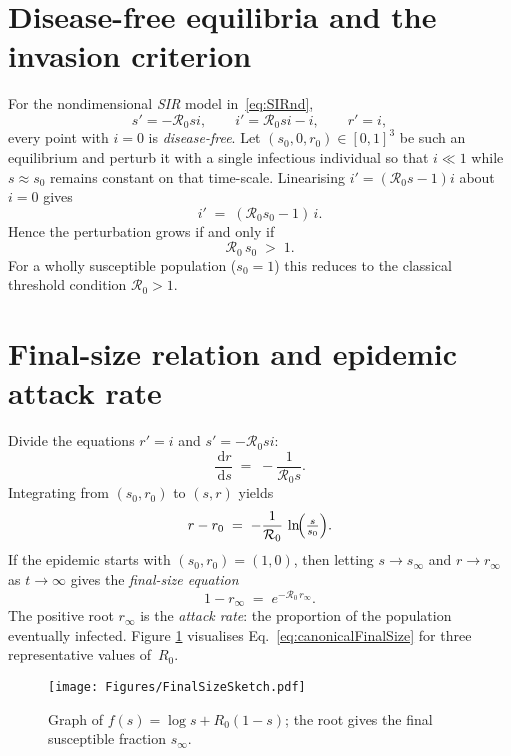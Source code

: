 \documentclass[11pt]{article}
\newcommand{\dd}{\,\mathrm{d}}
\newcommand{\RR}{\mathcal{R}_0}
\begin{document}
\section{Disease-free equilibria and the invasion criterion}\label{sec:DFE}

For the nondimensional \textit{SIR} model in~\cref{eq:SIRnd},
\[
s'=-\RR si, \qquad
i'=\RR si-i, \qquad
r'=i ,
\]
every point with $i=0$ is \emph{disease-free}.  Let
\(
(s_0,0,r_0)\in[0,1]^3
\)
be such an equilibrium and perturb it with a single infectious
individual so that $i\ll1$ while $s\approx s_0$ remains constant on that
time-scale.  Linearising $i'=(\RR s-1)i$ about $i=0$ gives
\begin{equation*}
  i' \;=\; (\RR s_0 - 1)\,i .
\end{equation*}
Hence the perturbation grows if and only if
\begin{equation*}
  \RR\,s_0 \;>\; 1 .
\end{equation*}
For a wholly susceptible population ($s_0=1$) this reduces to the classical
threshold condition $\RR>1$.

\section{Final-size relation and epidemic attack rate}\label{sec:FinalSize}

Divide the equations $r'=i$ and $s'=-\RR si$:
\[
\frac{\dd r}{\dd s} \;=\; -\frac{1}{\RR s}.
\]
Integrating from $(s_0,r_0)$ to $(s,r)$ yields
\begin{equation}\label{eq:generalFinalSize}
  r - r_0 \;=\; -\frac{1}{\RR}\,\ln\!\Bigl(\tfrac{s}{s_0}\Bigr).
\end{equation}
If the epidemic starts with $(s_0,r_0)=(1,0)$, then letting
$s\to s_\infty$ and $r\to r_\infty$ as $t\to\infty$ gives the
\emph{final-size equation}
\begin{equation}\label{eq:canonicalFinalSize}
  1 - r_\infty \;=\; e^{-\RR\,r_\infty}.
\end{equation}
The positive root $r_\infty$ is the \textit{attack rate}:
the proportion of the population eventually infected.
Figure \ref{fig:finalsize} visualises Eq.~\eqref{eq:canonicalFinalSize}
for three representative values of~$R_0$.

\begin{figure}[H]
  \centering
  \texttt{[image: Figures/FinalSizeSketch.pdf]}
  \caption{Graph of $f(s)=\log s + R_0(1-s)$; the root gives the final
           susceptible fraction $s_\infty$.}
  \label{fig:finalsize}
\end{figure}
\end{document}
